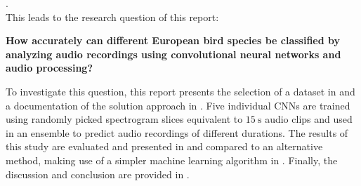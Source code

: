 \cite{Chollet2017}.\\
This leads to the research question of this report:
\begin{center}
    \textbf{How accurately can different European bird species be classified by analyzing audio recordings using convolutional neural networks and audio processing?}
\end{center}
To investigate this question, this report presents the selection of a dataset in  and a documentation of the solution approach in .
Five individual CNNs are trained using randomly picked spectrogram slices equivalent to $\qty{15}{\second}$ audio clips and used in an ensemble to predict audio recordings of 
different durations. The results of this study are evaluated and presented in  and compared to an alternative method, making use of a simpler machine learning 
algorithm in . Finally, the discussion and conclusion are provided in .


